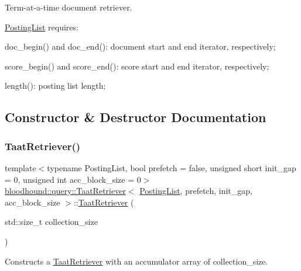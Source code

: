Term-\/at-\/a-\/time document retriever.

\mbox{\hyperlink{classbloodhound_1_1PostingList}{Posting\+List}} requires\+:
\begin{DoxyItemize}
\item doc\+\_\+begin() and doc\+\_\+end()\+: document start and end iterator, respectively;
\item score\+\_\+begin() and score\+\_\+end()\+: score start and end iterator, respectively;
\item length()\+: posting list length; 
\end{DoxyItemize}

\subsection{Constructor \& Destructor Documentation}
\mbox{\label{classbloodhound_1_1query_1_1TaatRetriever_af443da08f4200fb84a3481d47bc4ac35}} 
\subsubsection{\texorpdfstring{Taat\+Retriever()}{TaatRetriever()}}
{\footnotesize\ttfamily template$<$typename Posting\+List, bool prefetch = false, unsigned short init\+\_\+gap = 0, unsigned int acc\+\_\+block\+\_\+size = 0$>$ \\
\mbox{\hyperlink{classbloodhound_1_1query_1_1TaatRetriever}{bloodhound\+::query\+::\+Taat\+Retriever}}$<$ \mbox{\hyperlink{classbloodhound_1_1PostingList}{Posting\+List}}, prefetch, init\+\_\+gap, acc\+\_\+block\+\_\+size $>$\+::\mbox{\hyperlink{classbloodhound_1_1query_1_1TaatRetriever}{Taat\+Retriever}} (\begin{DoxyParamCaption}\item[{std\+::size\+\_\+t}]{collection\+\_\+size }\end{DoxyParamCaption})\hspace{0.3cm}{\ttfamily [inline]}}



Constructs a \mbox{\hyperlink{classbloodhound_1_1query_1_1TaatRetriever}{Taat\+Retriever}} with an accumulator array of collection\+\_\+size. 




